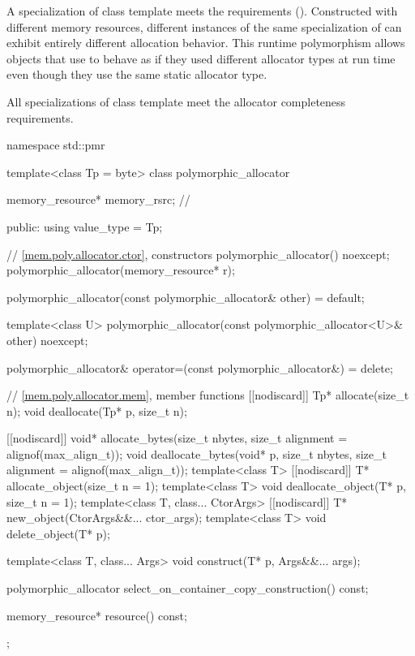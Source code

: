 \pnum
A specialization of class template 
meets the  requirements ().
Constructed with different memory resources,
different instances of the same specialization of 
can exhibit entirely different allocation behavior.
This runtime polymorphism allows objects that use 
to behave as if they used different allocator types at run time
even though they use the same static allocator type.

\pnum
All specializations of class template 
meet the allocator completeness requirements.

%
%
\begin{codeblock}
namespace std::pmr {
  template<class Tp = byte> class polymorphic_allocator {
    memory_resource* memory_rsrc;       // \expos

  public:
    using value_type = Tp;

    // \ref{mem.poly.allocator.ctor}, constructors
    polymorphic_allocator() noexcept;
    polymorphic_allocator(memory_resource* r);

    polymorphic_allocator(const polymorphic_allocator& other) = default;

    template<class U>
      polymorphic_allocator(const polymorphic_allocator<U>& other) noexcept;

    polymorphic_allocator& operator=(const polymorphic_allocator&) = delete;

    // \ref{mem.poly.allocator.mem}, member functions
    [[nodiscard]] Tp* allocate(size_t n);
    void deallocate(Tp* p, size_t n);

    [[nodiscard]] void* allocate_bytes(size_t nbytes, size_t alignment = alignof(max_align_t));
    void deallocate_bytes(void* p, size_t nbytes, size_t alignment = alignof(max_align_t));
    template<class T> [[nodiscard]] T* allocate_object(size_t n = 1);
    template<class T> void deallocate_object(T* p, size_t n = 1);
    template<class T, class... CtorArgs> [[nodiscard]] T* new_object(CtorArgs&&... ctor_args);
    template<class T> void delete_object(T* p);

    template<class T, class... Args>
      void construct(T* p, Args&&... args);

    polymorphic_allocator select_on_container_copy_construction() const;

    memory_resource* resource() const;
  };
}
\end{codeblock}

